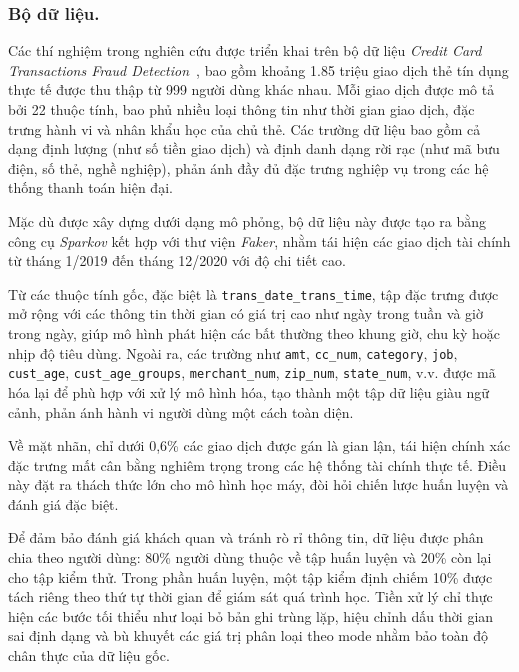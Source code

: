 \subsubsection{Bộ dữ liệu.}
\label{sec:dataset}

Các thí nghiệm trong nghiên cứu được triển khai trên bộ dữ liệu \textit{Credit Card Transactions Fraud Detection}~\cite{KaggleFraudData}, bao gồm khoảng 1{.}85 triệu giao dịch thẻ tín dụng thực tế được thu thập từ 999 người dùng khác nhau. Mỗi giao dịch được mô tả bởi 22 thuộc tính, bao phủ nhiều loại thông tin như thời gian giao dịch, đặc trưng hành vi và nhân khẩu học của chủ thẻ. Các trường dữ liệu bao gồm cả dạng định lượng (như số tiền giao dịch) và định danh dạng rời rạc (như mã bưu điện, số thẻ, nghề nghiệp), phản ánh đầy đủ đặc trưng nghiệp vụ trong các hệ thống thanh toán hiện đại.

Mặc dù được xây dựng dưới dạng mô phỏng, bộ dữ liệu này được tạo ra bằng công cụ \textit{Sparkov} kết hợp với thư viện \textit{Faker}, nhằm tái hiện các giao dịch tài chính từ tháng 1/2019 đến tháng 12/2020 với độ chi tiết cao.

Từ các thuộc tính gốc, đặc biệt là \texttt{trans\_date\_trans\_time}, tập đặc trưng được mở rộng với các thông tin thời gian có giá trị cao như ngày trong tuần và giờ trong ngày, giúp mô hình phát hiện các bất thường theo khung giờ, chu kỳ hoặc nhịp độ tiêu dùng. Ngoài ra, các trường như \texttt{amt}, \texttt{cc\_num}, \texttt{category}, \texttt{job}, \texttt{cust\_age}, \texttt{cust\_age\_groups}, \texttt{merchant\_num}, \texttt{zip\_num}, \texttt{state\_num}, v.v. được mã hóa lại để phù hợp với xử lý mô hình hóa, tạo thành một tập dữ liệu giàu ngữ cảnh, phản ánh hành vi người dùng một cách toàn diện.

Về mặt nhãn, chỉ dưới 0{,}6\% các giao dịch được gán là gian lận, tái hiện chính xác đặc trưng mất cân bằng nghiêm trọng trong các hệ thống tài chính thực tế. Điều này đặt ra thách thức lớn cho mô hình học máy, đòi hỏi chiến lược huấn luyện và đánh giá đặc biệt.

Để đảm bảo đánh giá khách quan và tránh rò rỉ thông tin, dữ liệu được phân chia theo người dùng: 80\% người dùng thuộc về tập huấn luyện và 20\% còn lại cho tập kiểm thử. Trong phần huấn luyện, một tập kiểm định chiếm 10\% được tách riêng theo thứ tự thời gian để giám sát quá trình học. Tiền xử lý chỉ thực hiện các bước tối thiểu như loại bỏ bản ghi trùng lặp, hiệu chỉnh dấu thời gian sai định dạng và bù khuyết các giá trị phân loại theo mode nhằm bảo toàn độ chân thực của dữ liệu gốc.

